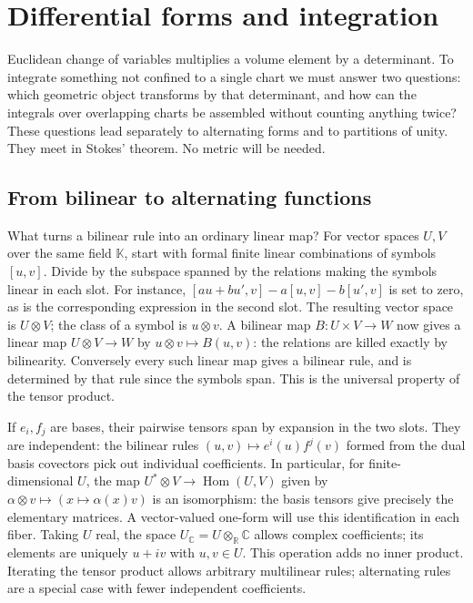 \chapter{Differential forms and integration}\label{f:forms}
Euclidean change of variables multiplies a volume element by a determinant. To integrate something not confined to a single chart we must answer two questions: which geometric object transforms by that determinant, and how can the integrals over overlapping charts be assembled without counting anything twice? These questions lead separately to alternating forms and to partitions of unity. They meet in Stokes' theorem. No metric will be needed.

\section{From bilinear to alternating functions}\label{f:tensor-product}
What turns a bilinear rule into an ordinary linear map? For vector spaces $U,V$ over the same field $\mathbb K$, start with formal finite linear combinations of symbols $[u,v]$. Divide by the subspace spanned by the relations making the symbols linear in each slot. For instance, $[a u+b u',v]-a[u,v]-b[u',v]$ is set to zero, as is the corresponding expression in the second slot. The resulting vector space is $U\otimes V$; the class of a symbol is $u\otimes v$. A bilinear map $B:U\times V\to W$ now gives a linear map $U\otimes V\to W$ by $u\otimes v\mapsto B(u,v)$: the relations are killed exactly by bilinearity. Conversely every such linear map gives a bilinear rule, and is determined by that rule since the symbols span. This is the universal property of the tensor product.

If $e_i,f_j$ are bases, their pairwise tensors span by expansion in the two slots. They are independent: the bilinear rules $(u,v)\mapsto e^i(u)f^j(v)$ formed from the dual basis covectors pick out individual coefficients. In particular, for finite-dimensional $U$, the map $U^*\otimes V\to\operatorname{Hom}(U,V)$ given by $\alpha\otimes v\mapsto (x\mapsto\alpha(x)v)$ is an isomorphism: the basis tensors give precisely the elementary matrices. A vector-valued one-form will use this identification in each fiber. Taking $U$ real, the space $U_{\mathbb C}=U\otimes_{\mathbb R}\mathbb C$ allows complex coefficients; its elements are uniquely $u+i v$ with $u,v\in U$. This operation adds no inner product. Iterating the tensor product allows arbitrary multilinear rules; alternating rules are a special case with fewer independent coefficients.

